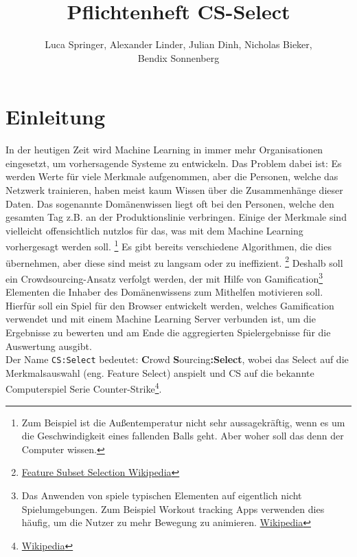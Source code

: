 \documentclass[a4paper]{scrreprt}
\begin{document}
    \title{Pflichtenheft CS-Select}
    \author{Luca Springer, Alexander Linder, Julian Dinh, Nicholas Bieker,\\ Bendix Sonnenberg}
    \maketitle

    \tableofcontents

    \chapter{Einleitung}
        In der heutigen Zeit wird Machine Learning in immer mehr Organisationen eingesetzt, um vorhersagende Systeme zu entwickeln.
        Das Problem dabei ist: Es werden Werte für viele Merkmale aufgenommen, aber die Personen, welche das Netzwerk trainieren, haben meist kaum Wissen über die Zusammenhänge dieser Daten.
        Das sogenannte Domänenwissen liegt oft bei den Personen, welche den gesamten Tag z.B. an der Produktionslinie verbringen. Einige der Merkmale sind vielleicht offensichtlich nutzlos
        für das, was mit dem Machine Learning vorhergesagt werden soll. \footnote{Zum Beispiel ist die Außentemperatur nicht sehr aussagekräftig, wenn es um die Geschwindigkeit eines fallenden
        Balls geht. Aber woher soll das denn der Computer wissen.} Es gibt bereits verschiedene Algorithmen, die dies übernehmen, aber diese sind meist zu langsam oder zu ineffizient.
        \footnote{\href{https://de.wikipedia.org/wiki/Feature\_Subset\_Selection}{Feature Subset Selection Wikipedia}} 
        Deshalb soll ein Crowdsourcing-Ansatz verfolgt werden, der mit Hilfe von Gamification\footnote{Das Anwenden von spiele typischen Elementen auf eigentlich nicht Spielumgebungen. Zum Beispiel Workout tracking Apps verwenden dies häufig, um die Nutzer zu mehr Bewegung zu animieren. \href{https://de.wikipedia.org/wiki/Gamification}{Wikipedia}} Elementen die Inhaber des Domänenwissens
        zum Mithelfen motivieren soll. \\
        Hierfür soll ein Spiel für den Browser entwickelt werden, welches Gamification verwendet und mit einem Machine Learning Server verbunden ist, um die Ergebnisse zu bewerten und am
        Ende die aggregierten Spielergebnisse für die Auswertung ausgibt.
        \\
        Der Name \texttt{CS:Select} bedeutet: \textbf{C}rowd \textbf{S}ourcing\textbf{:Select}, wobei das Select auf die Merkmalsauswahl (eng. Feature Select) anspielt und CS auf die bekannte
        Computerspiel Serie Counter-Strike\footnote{\href{https://de.wikipedia.org/wiki/Counter-Strike}{Wikipedia}}.
\end{document}
